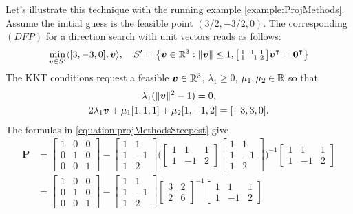 \begin{example}
Let's illustrate this technique with the running example \ref{example:ProjMethods}.  Assume the initial guess is the feasible point $(3/2, -3/2, 0)$.  The corresponding $(DFP)$ for a direction search with unit vectors reads as follows:
\begin{equation*}
\min_{\boldsymbol{v} \in S'} \langle [3,-3,0], \boldsymbol{v} \rangle, \quad S' = \big\{ \boldsymbol{v} \in \mathbb{R}^3 : \lVert \boldsymbol{v} \rVert\leq 1, \big[ \begin{smallmatrix} 1 & 1 & 1 \\ 1 & -1 & 2 \end{smallmatrix}\big] {\boldsymbol{v}}^\intercal = {\boldsymbol{0}}^\intercal \big\}
\end{equation*}
The KKT conditions request a feasible $\boldsymbol{v} \in \mathbb{R}^3$, $\lambda_1 \geq 0$, $\mu_1, \mu_2 \in \mathbb{R}$ so that
\begin{gather*}
\lambda_1(\lVert \boldsymbol{v} \rVert^2 - 1) = 0, \\
2\lambda_1 \boldsymbol{v} + \mu_1 [1,1,1] + \mu_2 [1,-1,2] = [-3,3,0].
\end{gather*}
The formulas in \eqref{equation:projMethodsSteepest} give
\begin{align*}
\boldsymbol{P} &= \begin{bmatrix} 1 & 0 & 0 \\ 0 & 1 & 0 \\ 0 & 0 & 1 \end{bmatrix} - \begin{bmatrix} 1 & 1 \\ 1 & -1 \\ 1 & 2 \end{bmatrix} \bigg( \begin{bmatrix} 1 & 1 & 1 \\ 1 & -1 & 2 \end{bmatrix} \begin{bmatrix} 1 & 1 \\ 1 & -1 \\ 1 & 2 \end{bmatrix} \bigg)^{-1} \begin{bmatrix} 1 & 1 & 1 \\ 1 & -1 & 2 \end{bmatrix} \\ 
&= \begin{bmatrix} 1 & 0 & 0 \\ 0 & 1 & 0 \\ 0 & 0 & 1 \end{bmatrix} - \begin{bmatrix} 1 & 1 \\ 1 & -1 \\ 1 & 2 \end{bmatrix} \begin{bmatrix} 3 & 2 \\ 2 & 6 \end{bmatrix}^{-1} \begin{bmatrix} 1 & 1 & 1 \\ 1 & -1 & 2 \end{bmatrix} \\

\end{align*}
\end{example}
